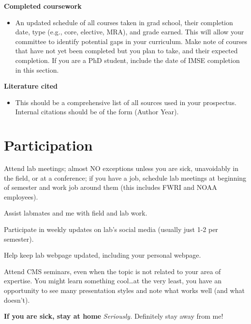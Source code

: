 \documentclass[
]{article}
\providecommand{\tightlist}{%
  \setlength{\itemsep}{0pt}\setlength{\parskip}{0pt}}
\begin{document}
\textbf{Completed coursework}

\begin{itemize}
\tightlist
\item
  An updated schedule of all courses taken in grad school, their completion date, type (e.g., core, elective, MRA), and grade earned. This will allow your committee to identify potential gaps in your curriculum. Make note of courses that have not yet been completed but you plan to take, and their expected completion. If you are a PhD student, include the date of IMSE completion in this section.
\end{itemize}

\textbf{Literature cited}

\begin{itemize}
\tightlist
\item
  This should be a comprehensive list of all sources used in your prospectus. Internal citations should be of the form (Author Year).
\end{itemize}

\hypertarget{participation}{%
\section{\texorpdfstring{\textbf{Participation}}{Participation}}\label{participation}}

Attend lab meetings; almost NO exceptions unless you are sick, unavoidably in the field, or at a conference; if you have a job, schedule lab meetings at beginning of semester and work job around them (this includes FWRI and NOAA employees).

Assist labmates and me with field and lab work.

Participate in weekly updates on lab's social media (usually just 1-2 per semester).

Help keep lab webpage updated, including your personal webpage.

Attend CMS seminars, even when the topic is not related to your area of expertise. You might learn something cool\ldots at the very least, you have an opportunity to see many presentation styles and note what works well (and what doesn't).

\textbf{If you are sick, stay at home} \emph{Seriously.} Definitely stay away from me!

  
\end{document}
